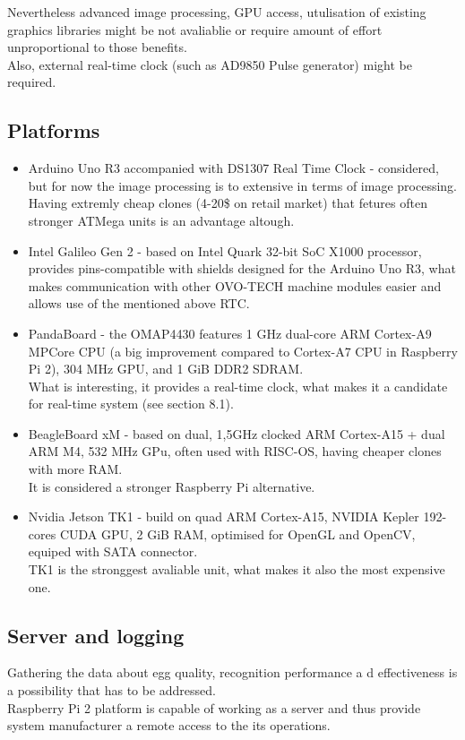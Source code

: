 \documentclass[12pt,twoside,a4paper]{article}
\begin{document}
Nevertheless advanced image processing, GPU access, utulisation of existing graphics libraries might be not avaliablie or require amount of effort unproportional to those benefits.\\
Also, external real-time clock (such as AD9850 Pulse generator) might be required.

\subsection{Platforms}
\begin{itemize}
  \item Arduino Uno R3 accompanied with DS1307 Real Time Clock - considered, but for now the image processing is to extensive in terms of image processing.\\
  Having extremly cheap clones (4-20\$ on retail market) that fetures often stronger ATMega units is an advantage altough.
  \item Intel Galileo Gen 2 - based on Intel Quark 32-bit SoC X1000 processor, provides pins-compatible with shields designed for the Arduino Uno R3, what makes communication with other OVO-TECH machine modules easier and allows use of the mentioned above RTC.
  \item PandaBoard - the OMAP4430 features 1 GHz dual-core ARM Cortex-A9 MPCore CPU (a big improvement compared to Cortex-A7 CPU in Raspberry Pi 2), 304 MHz GPU, and 1 GiB DDR2 SDRAM.\\
  What is interesting, it provides a real-time clock, what makes it a candidate for real-time system (see section 8.1).
  \item BeagleBoard xM - based on dual, 1,5GHz clocked ARM Cortex-A15  + dual ARM M4, 532 MHz GPu, often used with RISC-OS, having cheaper clones with more RAM.\\It is considered a stronger Raspberry Pi alternative.
  \item Nvidia Jetson TK1 - build on quad ARM Cortex-A15, NVIDIA Kepler 192-cores CUDA GPU, 2 GiB RAM, optimised for OpenGL and OpenCV, equiped with SATA connector.\\
  TK1 is the stronggest avaliable unit, what makes it also the most expensive one.

\end{itemize}
\subsection{Server and logging}
Gathering the data about egg quality, recognition performance a
d effectiveness is a possibility that has to be addressed.\\
Raspberry Pi 2 platform is capable of working as a server and thus provide system manufacturer a remote access to the its operations.
\end{document}
